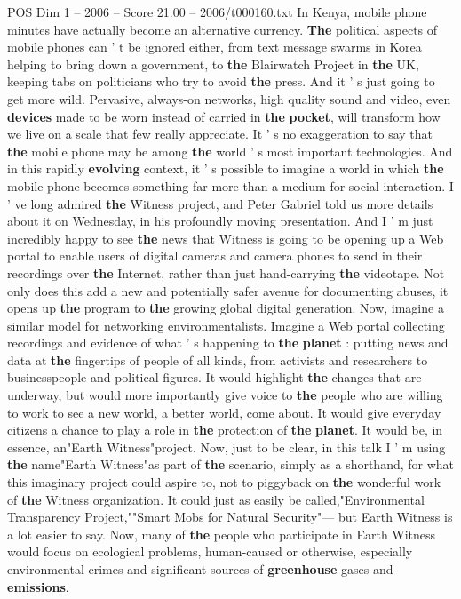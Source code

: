 \begin{textsample}{POS Dim 1 – 2006 – Score 21.00 – 2006/t000160.txt}
In Kenya, mobile phone minutes have actually become an alternative currency. \textbf{The} political aspects of mobile phones can ' t be ignored either, from text message swarms in Korea helping to bring down a government, to \textbf{the} Blairwatch Project in \textbf{the} UK, keeping tabs on politicians who try to avoid \textbf{the} press.
And it ' s just going to get more wild.
Pervasive, always-on networks, high quality sound and video, even \textbf{devices} made to be worn instead of carried in \textbf{the} \textbf{pocket}, will transform how we live on a scale that few really appreciate.
It ' s no exaggeration to say that \textbf{the} mobile phone may be among \textbf{the} world ' s most important technologies.
And in this rapidly \textbf{evolving} context, it ' s possible to imagine a world in which \textbf{the} mobile phone becomes something far more than a medium for social interaction.
I ' ve long admired \textbf{the} Witness project, and Peter Gabriel told us more details about it on Wednesday, in his profoundly moving presentation.
And I ' m just incredibly happy to see \textbf{the} news that Witness is going to be opening up a Web portal to enable users of digital cameras and camera phones to send in their recordings over \textbf{the} Internet, rather than just hand-carrying \textbf{the} videotape.
Not only does this add a new and potentially safer avenue for documenting abuses, it opens up \textbf{the} program to \textbf{the} growing global digital generation.
Now, imagine a similar model for networking environmentalists.
Imagine a Web portal collecting recordings and evidence of what ' s happening to \textbf{the} \textbf{planet} : putting news and data at \textbf{the} fingertips of people of all kinds, from activists and researchers to businesspeople and political figures.
It would highlight \textbf{the} changes that are underway, but would more importantly give voice to \textbf{the} people who are willing to work to see a new world, a better world, come about.
It would give everyday citizens a chance to play a role in \textbf{the} protection of \textbf{the} \textbf{planet}.
It would be, in essence, an"Earth Witness"project.
Now, just to be clear, in this talk I ' m using \textbf{the} name"Earth Witness"as part of \textbf{the} scenario, simply as a shorthand, for what this imaginary project could aspire to, not to piggyback on \textbf{the} wonderful work of \textbf{the} Witness organization.
It could just as easily be called,"Environmental Transparency Project,""Smart Mobs for Natural Security"— but Earth Witness is a lot easier to say.
Now, many of \textbf{the} people who participate in Earth Witness would focus on ecological problems, human-caused or otherwise, especially environmental crimes and significant sources of \textbf{greenhouse} gases and \textbf{emissions}.

\end{textsample}
